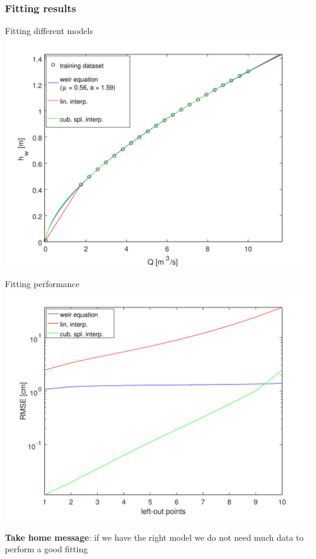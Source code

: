 \documentclass[xcolor=dvipsnames, USenglish]{beamer}  %
\begin{document}
  \begin{frame}
    \frametitle{Fitting results}
    \begin{minipage}{.5\textwidth}
      \centering
      \small{Fitting different models}\\
      \includegraphics[width=\textwidth]{img/fitting_results.png}
    \end{minipage}%
    \begin{minipage}{.5\textwidth}
      \centering
      \small{Fitting performance}\\
      \includegraphics[width=\textwidth]{img/fitting_errors.png}
    \end{minipage}
    \vfill
    \pause
    \small{\textbf{Take home message}: if we have the right model we do not need much data to perform a good fitting}
  \end{frame}
\end{document}
